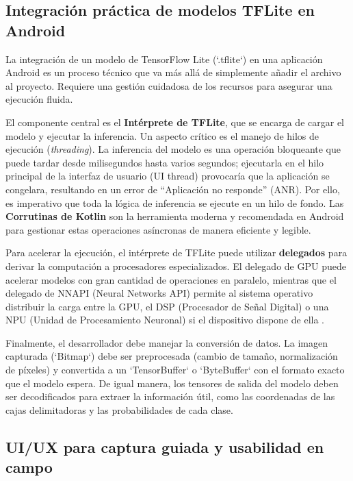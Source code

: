 \subsection{Integración práctica de modelos TFLite en Android}
\label{ssec:tflite_integration}

La integración de un modelo de TensorFlow Lite (`.tflite`) en una aplicación Android es un proceso técnico que va más allá de simplemente añadir el archivo al proyecto. Requiere una gestión cuidadosa de los recursos para asegurar una ejecución fluida.

El componente central es el \textbf{Intérprete de TFLite}, que se encarga de cargar el modelo y ejecutar la inferencia. Un aspecto crítico es el manejo de hilos de ejecución (\textit{threading}). La inferencia del modelo es una operación bloqueante que puede tardar desde milisegundos hasta varios segundos; ejecutarla en el hilo principal de la interfaz de usuario (UI thread) provocaría que la aplicación se congelara, resultando en un error de ``Aplicación no responde'' (ANR). Por ello, es imperativo que toda la lógica de inferencia se ejecute en un hilo de fondo. Las \textbf{Corrutinas de Kotlin} son la herramienta moderna y recomendada en Android para gestionar estas operaciones asíncronas de manera eficiente y legible.

Para acelerar la ejecución, el intérprete de TFLite puede utilizar \textbf{delegados} para derivar la computación a procesadores especializados. El delegado de GPU puede acelerar modelos con gran cantidad de operaciones en paralelo, mientras que el delegado de NNAPI (Neural Networks API) permite al sistema operativo distribuir la carga entre la GPU, el DSP (Procesador de Señal Digital) o una NPU (Unidad de Procesamiento Neuronal) si el dispositivo dispone de ella \parencite{Albonico2023Benchmarking}.

Finalmente, el desarrollador debe manejar la conversión de datos. La imagen capturada (`Bitmap`) debe ser preprocesada (cambio de tamaño, normalización de píxeles) y convertida a un `TensorBuffer` o `ByteBuffer` con el formato exacto que el modelo espera. De igual manera, los tensores de salida del modelo deben ser decodificados para extraer la información útil, como las coordenadas de las cajas delimitadoras y las probabilidades de cada clase.

\subsection{UI/UX para captura guiada y usabilidad en campo}
\label{ssec:guided_capture_ux}

